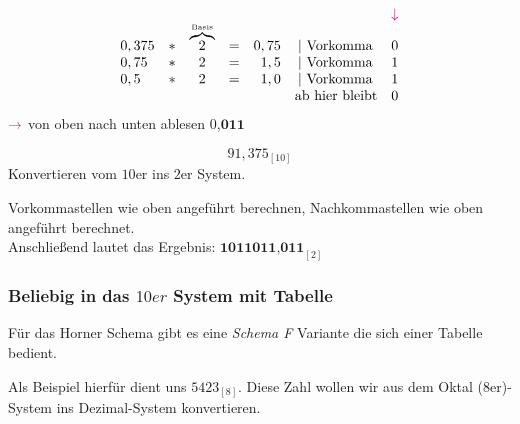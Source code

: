 \documentclass{article}
\begin{document}
\begin{answer}[Lösung]
    \begin{align*}
        \begin{array}{lccrrrl}
                  &   &                                             &   &      &                       & \textcolor{RubineRed}{\downarrow} \\
            0,375 & * & \overset{\text{\tiny Basis}}{\overbrace{2}} & = & 0,75 & | \text{ Vorkomma }   & 0                                 \\
            0,75  & * & 2                                           & = & 1,5  & | \text{ Vorkomma }   & 1                                 \\
            0,5   & * & 2                                           & = & 1,0  & |  \text{ Vorkomma }  & 1                                 \\
                  &   &                                             &   &      & \text{ab hier bleibt} & 0                                 \\
        \end{array}
    \end{align*}
    $\textcolor{RubineRed}{\rightarrow}$ von oben nach unten ablesen 0,$\textbf{011}$
\end{answer}


\begin{question}
    \begin{equation*}
        91,375_{[10]}
    \end{equation*}
    Konvertieren vom $10$er ins $2$er System.
\end{question}

\begin{answer}[Lösung]
    Vorkommastellen wie oben angeführt berechnen, Nachkommastellen wie oben angeführt berechnet. \\
    Anschließend lautet das Ergebnis: $\textbf{1011011,011}_{[2]}$
\end{answer}

\subsubsection{Beliebig in das $10er$ System mit Tabelle}

Für das Horner Schema gibt es eine \emph{Schema F} Variante die sich einer Tabelle bedient.

Als Beispiel hierfür dient uns $5423_{[8]}$. Diese Zahl wollen wir aus dem Oktal ($8$er)-System ins Dezimal-System konvertieren.
\end{document}
